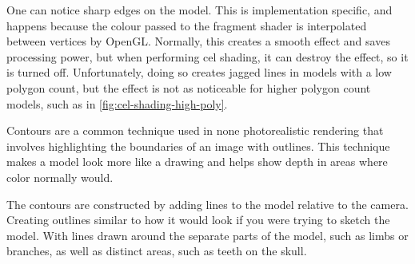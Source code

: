 One can notice sharp edges on the model. This is implementation specific, and happens because the 
colour passed to the fragment shader is interpolated between vertices by OpenGL. Normally, this creates 
a smooth effect and saves processing power, but when performing cel shading, it can destroy the effect, 
so it is turned off. Unfortunately, doing so creates jagged lines in models with a low polygon count, 
but the effect is  not as noticeable for higher polygon count models, such as in 
\autoref{fig:cel-shading-high-poly}. 

\newpage 

Contours are a common technique used in none photorealistic rendering that involves highlighting 
the boundaries of an image with outlines. This technique makes a model look more like a drawing 
and helps show depth in areas where color normally would.

The contours are constructed by adding lines to the model relative to the camera. Creating outlines 
similar to how it would look if you were trying to sketch the model. With lines drawn around the 
separate parts of the model, such as limbs or branches, as well as distinct areas, such as teeth on 
the skull.

